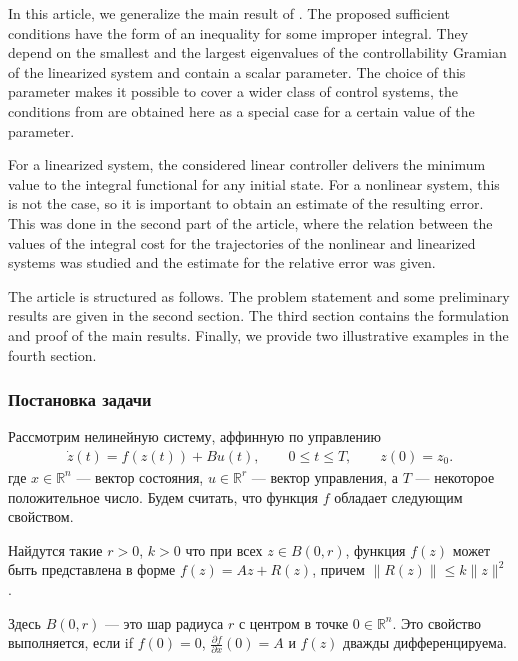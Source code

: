 \documentclass[../main.tex]{subfiles}
\begin{document}
In this article, we generalize the main result of \cite{GusevOsipov}. The proposed sufficient conditions have the form of an inequality for some improper integral. They depend on the smallest and the largest eigenvalues of the controllability Gramian of the linearized system and contain a scalar parameter. The choice of this parameter makes it possible to cover a wider class of control systems, the conditions from \cite{GusevOsipov} are obtained here as a special case for a certain value of the parameter.

For a linearized system, the considered linear controller delivers the minimum value to the integral functional for any initial state. For a nonlinear system, this is not the case, so it is important to obtain an estimate of the resulting error. This was done in the second part of the article, where  the relation between the values of the integral cost for the trajectories of the nonlinear and linearized systems was studied and  the estimate for the relative error was given. 

The article is structured as follows. The problem statement and some preliminary results are given in the second section. The third section contains the formulation and proof of the main results. Finally, we provide two illustrative examples in the fourth section.

\subsubsection{Постановка задачи}

Рассмотрим нелинейную систему, аффинную по управлению
\begin{gather}\label{sec22:nonlinear}
	\dot{z}(t)=f(z(t))+B u(t),\qquad 0 \leqslant t \leqslant T, \qquad z(0) = z_0.
\end{gather}
 где $ x \in \mathbb{R}^n $ --- вектор состояния, $ u \in \mathbb{R}^r $ --- вектор управления, а $ 
T$ --- некоторое положительное число. 
Будем считать, что функция $f$ обладает следующим свойством.
\begin{property}\label{prop:Residial_term_bounds}
	 Найдутся такие  $r>0$, $k>0$  что при всех $ z \in B(0,r) $, функция  $f(z)$ может быть представлена в форме  $ f(z) = Az + R(z) $, причем  $ \|R(z) \| \leqslant k \| z\|^2  $. 
\end{property}
Здесь $ B(0,r) $ --- это шар радиуса $r$  с центром в точке $0 \in \mathbb{R}^n$. 
Это свойство выполняется, если if $f(0) = 0 $, $\frac{\partial f}{\partial x}(0) 
= A $ и $f(z)$ дважды дифференцируема. 
\end{document}
